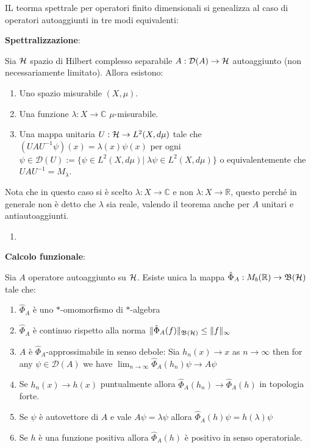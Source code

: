 IL teorma spettrale per operatori finito dimensionali si genealizza al caso di operatori autoaggiunti in tre modi equivalenti:

\textbf{Spettralizzazione}: 
\begin{theorem}
    Sia $\operatorname{\mathcal{H}}$ spazio di Hilbert complesso separabile $A: \mathcal{D}(A) \to \operatorname{\mathcal{H}}$ autoaggiunto (non necessariamente limitato). Allora esistono:
\begin{enumerate}
    \item Uno spazio misurabile $(X, \mu)$.
    \item Una funzione $\lambda : X \to \mathbb{C}$ $\mu$-misurabile.
    \item Una mappa unitaria $U:\operatorname{\mathcal{H}} \to L^2(X,d \mu)$ tale che $(UAU^{-1} \psi)(x) = \lambda(x) \psi(x)$ per ogni $\psi \in \mathcal{D}(U):= \{ \psi \in L^2(X,d\mu)| \; \lambda \psi \in L^2(X, d \mu)\}$ o equivalentemente che $UAU^{-1} = M_\lambda$.
\end{enumerate}
\end{theorem}

Nota che in questo caso si è scelto $\lambda: X \to \mathbb{C}$ e non $\lambda: X \to \mathbb{R}$, questo perché in generale non è detto che $\lambda$ sia reale, valendo il teorema anche per $A$ unitari e antiautoaggiunti.

\begin{example}
    \begin{enumerate}
        \item %
    \end{enumerate}
\end{example}

\textbf{Calcolo funzionale}: 
\begin{theorem}
    Sia $A$ operatore autoaggiunto su $\operatorname{\mathcal{H}}$. Esiste unica la mappa $\hat{\Phi}_A: M_b(\operatorname{\mathbb{R}}) \to \operatorname{\mathfrak{B}(\mathcal{H})}$ tale che:
\begin{enumerate}
    \item $\hat{\Phi}_A$ è uno $*$-omomorfismo di $*$-algebra 
    \item $\hat{\Phi}_A$ è continuo rispetto alla norma $\|
    \hat{\Phi}_A(f) \|_{\operatorname{\mathfrak{B}(\mathcal{H})}} \leq \| f \|_\infty$
    \item $A$ è $\hat{\Phi}_A$-approssimabile in senso debole: Sia $h_n(x) \to x$ as $n \to \infty$ then for any $\psi \in \mathcal{D}(A)$ we have $\lim_{n \to \infty} \hat{\Phi}_A(h_n) \psi \to A \psi $
    \item Se $h_n(x) \to h(x)$ puntualmente allora $\hat{\Phi}_A(h_n) \to \hat{\Phi}_A(h)$ in topologia forte.
    \item Se $\psi$ è autovettore di $A$ e vale $A \psi = \lambda \psi$ allora $\hat{\Phi}_A(h)\psi = h(\lambda)\psi$ 
    \item Se $h$ è una funzione positiva allora $\hat{\Phi}_A(h)$ è positivo in senso operatoriale.
\end{enumerate}
\label{thm:funcal}
\end{theorem}


